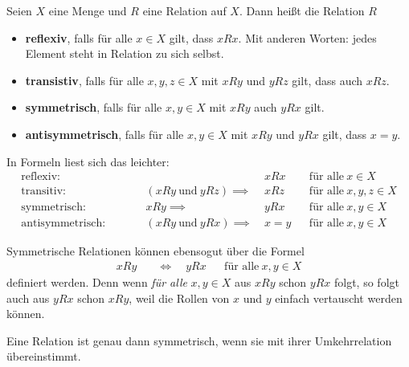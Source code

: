 \begin{de}    
    Seien $X$ eine Menge und $R$ eine Relation auf $X$. Dann heißt die Relation $R$
    \begin{itemize}
        \item \textbf{reflexiv}, falls für alle $x\in X$ gilt, dass $xRx$. Mit anderen Worten: jedes Element steht in Relation zu sich selbst.
        \item \textbf{transistiv}, falls für alle $x,y,z\in X$ mit $xRy$ und $yRz$ gilt, dass auch $xRz$.
        \item \textbf{symmetrisch}, falls für alle $x,y\in X$ mit $xRy$ auch $yRx$ gilt.
        \item \textbf{antisymmetrisch}, falls für alle $x,y\in X$ mit $xRy$ und $yRx$ gilt, dass $x=y$.
    \end{itemize}
    In Formeln liest sich das leichter:
    \begin{align*}
        \text{reflexiv:} \qquad &&& xRx && \text{für alle}\ x\in X \\
        \text{transitiv:} \qquad && (xRy\ \text{und}\ yRz) \implies\ & xRz && \text{für alle}\ x,y,z\in X\\
        \text{symmetrisch:} \qquad && xRy \implies\ & yRx && \text{für alle}\ x,y\in X \\
        \text{antisymmetrisch:} \qquad && (xRy\ \text{und}\ yRx) \implies\ & x=y && \text{für alle}\ x,y\in X
    \end{align*}
\end{de}


\begin{bem}
    Symmetrische Relationen können ebensogut über die Formel
    \begin{align*}
        xRy\quad & \iff \quad yRx && \text{für alle}\ x,y\in X
    \end{align*}
    definiert werden. Denn wenn \emph{für alle} $x,y\in X$ aus $xRy$ schon $yRx$ folgt, so folgt auch aus $yRx$ schon $xRy$, weil die Rollen von $x$ und $y$ einfach vertauscht werden können.

    Eine Relation ist genau dann symmetrisch, wenn sie mit ihrer Umkehrrelation übereinstimmt.
\end{bem}


